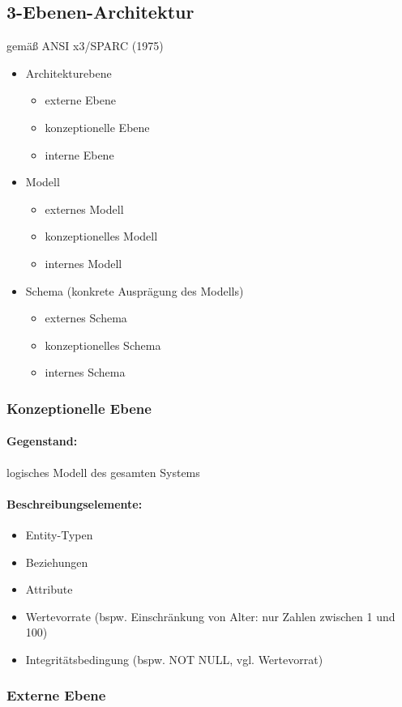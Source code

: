 \subsection{3-Ebenen-Architektur}
gemäß ANSI x3/SPARC (1975)
\begin{itemize}
\item Architekturebene
\begin{itemize}
\item externe Ebene
\item konzeptionelle Ebene
\item interne Ebene
\end{itemize}
\item Modell
\begin{itemize}
\item externes Modell
\item konzeptionelles Modell
\item internes Modell
\end{itemize}
\item Schema (konkrete Ausprägung des Modells)
\begin{itemize}
\item externes Schema
\item konzeptionelles Schema
\item internes Schema
\end{itemize}
\end{itemize}

\subsubsection{Konzeptionelle Ebene}
\paragraph{Gegenstand:} logisches Modell des gesamten Systems
\paragraph{Beschreibungselemente:}
\begin{itemize}
\item Entity-Typen
\item Beziehungen
\item Attribute
\item Wertevorrate (bspw. Einschränkung von Alter: nur Zahlen zwischen 1 und 100)
\item Integritätsbedingung (bspw. NOT NULL, vgl. Wertevorrat)
\end{itemize}
\subsubsection{Externe Ebene}
